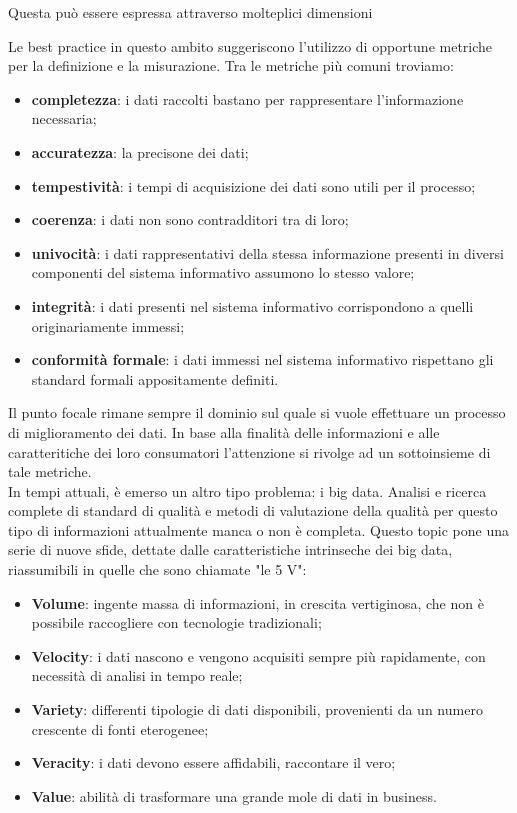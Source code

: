 \documentclass[a4paper,12pt]{article}
\begin{document}
Questa può essere espressa attraverso molteplici dimensioni


\noindent Le best practice in questo ambito suggeriscono l’utilizzo di opportune metriche per la definizione e la misurazione. Tra le metriche più comuni troviamo:

\begin{itemize}
\item \textbf{completezza}: i dati raccolti bastano per rappresentare l'informazione necessaria; 
\item \textbf{accuratezza}: la precisone dei dati;
\item \textbf{tempestività}: i tempi di acquisizione dei dati sono utili per il processo;
\item \textbf{coerenza}: i dati non sono contradditori tra di loro;
\item \textbf{univocità}: i dati rappresentativi della stessa informazione presenti in diversi componenti del sistema informativo assumono lo stesso valore;
\item \textbf{integrità}: i dati presenti nel sistema informativo corrispondono a quelli originariamente immessi;
\item \textbf{conformità formale}: i dati immessi nel sistema informativo rispettano gli standard formali appositamente definiti.
\end{itemize} 

\bigskip

\noindent Il punto focale rimane sempre il dominio sul quale si vuole effettuare un processo di miglioramento dei dati. In base alla finalità delle informazioni e alle caratteritiche dei loro consumatori l'attenzione si rivolge ad un sottoinsieme di tale metriche.\\
In tempi attuali, è emerso un altro tipo problema: i big data. Analisi e ricerca complete di standard di qualità e metodi di valutazione della qualità per questo tipo di informazioni attualmente manca o non è completa. Questo topic pone una serie di nuove sfide, dettate dalle caratteristiche intrinseche dei big data, riassumibili in quelle che sono chiamate "le 5 V":
\begin{itemize}
	\item \textbf{Volume}: ingente massa di informazioni, in crescita vertiginosa, che non è possibile raccogliere con tecnologie tradizionali;
	\item \textbf{Velocity}: i dati nascono e vengono acquisiti sempre più rapidamente, con necessità di analisi in tempo reale;
	\item \textbf{Variety}: differenti tipologie di dati disponibili, provenienti da un numero crescente di fonti eterogenee;
	\item \textbf{Veracity}: i dati devono essere affidabili, raccontare il vero;
	\item \textbf{Value}: abilità di trasformare una grande mole di dati in business.
\end{itemize}
\end{document}
